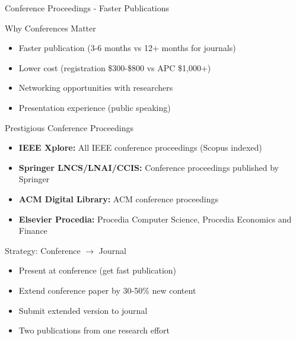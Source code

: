 \documentclass[11pt]{beamer}
\begin{document}
	\begin{frame}{Conference Proceedings - Faster Publications}
		\scriptsize
		\begin{block}{Why Conferences Matter}
			\begin{itemize}
				\item Faster publication (3-6 months vs 12+ months for journals)
				\item Lower cost (registration \$300-\$800 vs APC \$1,000+)
				\item Networking opportunities with researchers
				\item Presentation experience (public speaking)
			\end{itemize}
		\end{block}
		\begin{block}{Prestigious Conference Proceedings}
			\begin{itemize}
				\item \textbf{IEEE Xplore:} All IEEE conference proceedings (Scopus indexed)
				\item \textbf{Springer LNCS/LNAI/CCIS:} Conference proceedings published by Springer
				\item \textbf{ACM Digital Library:} ACM conference proceedings
				\item \textbf{Elsevier Procedia:} Procedia Computer Science, Procedia Economics and Finance
			\end{itemize}
		\end{block}
		\begin{block}{Strategy: Conference $\rightarrow$ Journal}
			\begin{itemize}
				\item Present at conference (get fast publication)
				\item Extend conference paper by 30-50\% new content
				\item Submit extended version to journal
				\item Two publications from one research effort
			\end{itemize}
		\end{block}
	\end{frame}
	
\end{document}
